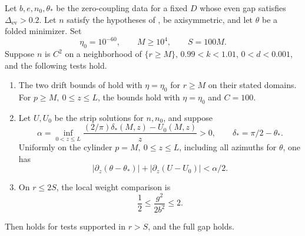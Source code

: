 \begin{lemma}
\label{lem:quantitative-gap}
Let \(b,e,n_0,\theta_*\) be the zero-coupling data for a fixed \(D\)
whose even gap satisfies \(\Delta_{\mathrm{ev}}>0.2\).
Let \(n\) satisfy the hypotheses of ,
be axisymmetric, and let \(\theta\) be a folded minimizer.  Set
\[
 \eta_0=10^{-60},\qquad M\ge10^4,\qquad S=100M.
\]
Suppose \(n\) is \(C^2\) on a neighborhood of \(\{r\ge M\}\),
\(0.99<k<1.01\), \(0<d<0.001\), and the following tests hold.
\begin{enumerate}[label=\textup{(\roman*)}]
\item The two drift bounds of  hold with
\(\eta=\eta_0\) for \(r\ge M\) on their stated domains.
For \(p\ge M,\ 0\le z\le L\), the bounds
 hold with
\(\eta=\eta_0\) and \(C=100\).
\item Let \(U,U_0\) be the strip solutions for \(n,n_0\), and suppose
\[
 \alpha=\inf_{0<z\le L}
     \frac{(2/\pi)\delta_*(M,z)-U_0(M,z)}{z}>0,
 \qquad \delta_*=\pi/2-\theta_*.
\]
Uniformly on the cylinder \(p=M,\ 0\le z\le L\), including all
azimuths for \(\theta\), one has
\[
 |\partial_z(\theta-\theta_*)|
       +|\partial_z(U-U_0)|<\alpha/2.
\]
\item On \(r\le2S\), the local weight comparison is
\[
 \frac12\le\frac{g^2}{2b^2}\le2.
\]
\end{enumerate}
Then  holds for tests supported in
\(r>S\), and the full gap  holds.
\end{lemma}

